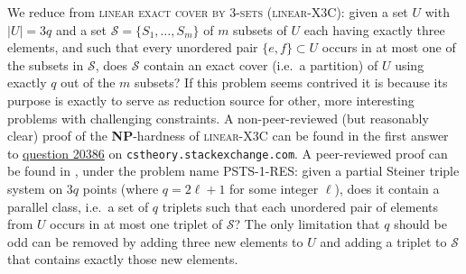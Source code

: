 \documentclass[envcountsect,envcountsame]{svjour3}
\theoremstyle{changebreak}                %
\begin{document}
We reduce from \textsc{linear exact cover by 3-sets} (\textsc{linear}-X3C): given a set $U$ with $|U|=3q$ and a set $\mathcal{S}=\{S_1,\ldots,S_m\}$ of $m$ subsets of $U$ each having exactly three elements, and such that every unordered pair $\{e,f\}\subset U$ occurs in at most one of the subsets in $\mathcal{S}$, does $\mathcal{S}$ contain an exact cover (i.e.~a partition) of $U$ using exactly $q$ out of the $m$ subsets? If this problem seems contrived it is because its purpose is exactly to serve as reduction source for other, more interesting problems with challenging constraints. A non-peer-reviewed (but reasonably clear) proof of the \textbf{NP}-hardness of \textsc{linear}-X3C can be found in the first answer to \href{https://cstheory.stackexchange.com/questions/20386/}{question 20386} on \texttt{cstheory.stackexchange.com}. A peer-reviewed proof can be found in \cite[\S 2]{toulouse}, under the problem name PSTS-1-RES: given a partial Steiner triple system on $3q$ points (where $q=2\ell+1$ for some integer $\ell$), does it contain a parallel class, i.e.~a set of $q$ triplets such that each unordered pair of elements from $U$ occurs in at most one triplet of $\mathcal{S}$? The only limitation that $q$ should be odd can be removed by adding three new elements to $U$ and adding a triplet to $\mathcal{S}$ that contains exactly those new elements.
\end{document}
